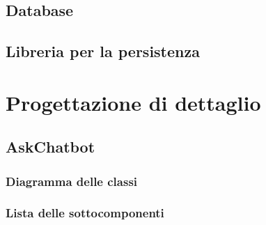 \documentclass[10pt, a4paper]{article}
\begin{document}
\subsection{Database} %

\subsection{Libreria per la persistenza} %

\newpage

\section{Progettazione di dettaglio}

    \subsection{AskChatbot}
    \subsubsection{Diagramma delle classi}
    \subsubsection{Lista delle sottocomponenti}
    
\end{document}
